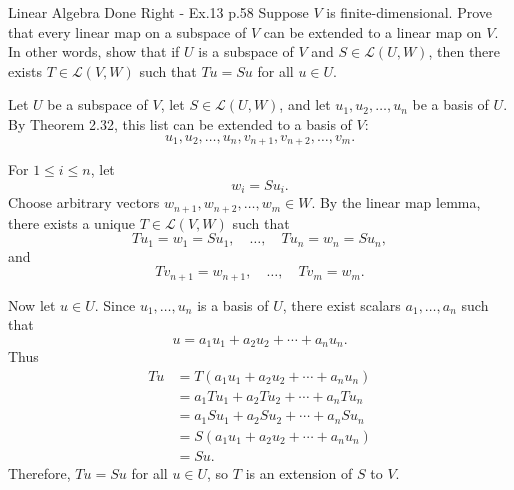 \begin{problem}{}{}{Linear Algebra Done Right - Ex.13 p.58}
Suppose \(V\) is finite-dimensional. Prove that every linear map on a
subspace of \(V\) can be extended to a linear map on \(V\). In other words,
show that if \(U\) is a subspace of \(V\) and
\(S \in \mathcal{L}(U,W)\), then there exists
\(T \in \mathcal{L}(V,W)\) such that \( Tu = Su\)
for all \(u \in U\).
\end{problem}

\begin{solution}
Let \(U\) be a subspace of \(V\), let \(S \in \mathcal{L}(U,W)\),
and let \(u_1,u_2,\dots,u_n\) be a basis of \(U\). By Theorem 2.32,
this list can be extended to a basis of \(V\):
\[
    u_1,u_2,\dots,u_n,v_{n+1},v_{n+2},\dots,v_m .
\]

For \(1 \leq i \leq n\), let
\[
    w_i = Su_i.
\]
Choose arbitrary vectors \(w_{n+1},w_{n+2},\dots,w_m \in W\).
By the linear map lemma, there exists a unique
\(T \in \mathcal{L}(V,W)\) such that
\[
    Tu_1 = w_1 = Su_1,\quad \dots,\quad Tu_n = w_n = Su_n,
\]
and
\[
    Tv_{n+1} = w_{n+1},\quad \dots,\quad Tv_m = w_m.
\]

Now let \(u \in U\). Since \(u_1,\dots,u_n\) is a basis of \(U\),
there exist scalars \(a_1,\dots,a_n\) such that
\[
    u = a_1u_1 + a_2u_2 + \cdots + a_nu_n.
\]
Thus
\[
\begin{aligned}
    Tu
    &= T(a_1u_1 + a_2u_2 + \cdots + a_nu_n) \\
    &= a_1Tu_1 + a_2Tu_2 + \cdots + a_nTu_n \\
    &= a_1Su_1 + a_2Su_2 + \cdots + a_nSu_n \\
    &= S(a_1u_1 + a_2u_2 + \cdots + a_nu_n) \\
    &= Su.
\end{aligned}
\]
Therefore, \(Tu = Su\) for all \(u \in U\), so \(T\) is an extension
of \(S\) to \(V\).
\end{solution}
